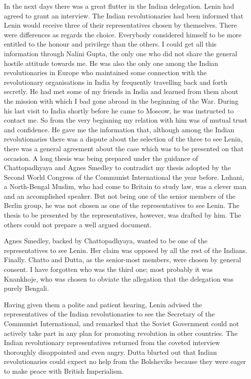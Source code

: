 In the next days there was a great flutter in the Indian delegation. Lenin had agreed to grant an interview. The Indian revolutionaries had been informed that Lenin would receive 
three of their representatives chosen by themselves. There were differences as regards the choice. Everybody considered himself to be more entitled to the honour and privilege than the others. I could get all this information through Nalini Gupta, the only one who did not share the general hostile attitude towards me. He was also the only one among the Indian revolutionaries in Europe who maintained some connection with the revolutionary organisations in India by frequently travelling back and forth secretly. He had met some of my friends in India and learned from them about the mission with which I bad gone abroad in the beginning of the War. During his last visit to India shortly before he came to Moscow, he was instructed to contact me. So from the very beginning my relation with him was of mutual trust and confidence. He gave me the information that, although among the Indian revolutionaries there was a dispute about the selection of the three to see Lenin, there was a general agreement about the case which was to be presented on that occasion. A long thesis was being prepared under the guidance of Chattopadhyaya and Agnes Smedley to contradict my thesis adopted by the Second World Congress of the Communist International the year before. Luhani, a North-Bengal Muslim, who had come to Britain to study law, was a clever man and an accomplished speaker. But not being one of the senior members of the Berlin group, he was not chosen as one of the representatives to see Lenin. The thesis to be presented by the 
representatives, however, was drafted by him. The others could not prepare a well argued document. 

Agnes Smedley, backed by Chattopadhyaya, wanted to be one of the representatives to see Lenin. Her claim was opposed by all the rest of the Indians. Finally. Chatto and Dutta, as the senior-most members, were chosen by general consent. I have forgotten who was the third one; most probably it was Knankhoje, who was chosen to obviate the allegation that the delegation was purely Bengali.

Having given them a polite and patient hearing, Lenin advised the representatives of the Indian revolutionaries to see the Secretary of the Communist International, and remarked that the Soviet Government could not actively take part in any plan for promoting revolution in other countries. The Indian revolutionary representatives returned from the coveted interview thoroughly disappointed and even angry. Dutta blurted out that Indian revolutionaries could expect no help from the Bolsheviks because they were eager to make peace with British Imperialism.

